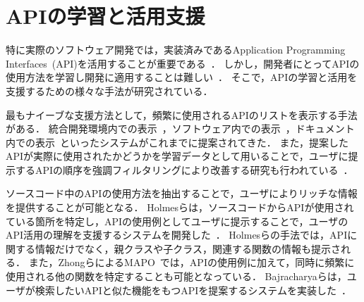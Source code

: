 

\section{APIの学習と活用支援}

特に実際のソフトウェア開発では，実装済みであるApplication Programming Interfaces~(API)を活用することが重要である~\cite{Patterns_for_API_migration}．
しかし，開発者にとってAPIの使用方法を学習し開発に適用することは難しい~\cite{robillard2011field}．
そこで，APIの学習と活用を支援するための様々な手法が研究されている．

最もナイーブな支援方法として，頻繁に使用されるAPIのリストを表示する手法がある．
統合開発環境内での表示~\cite{Holmes_2008_MSR_Eclipse_APIs}，ソフトウェア内での表示~\cite{UIST_2009_CommunityCommands}，ドキュメント内での表示~\cite{VLHCC_2009_API_doc_API_usage}といったシステムがこれまでに提案されてきた．
また，提案したAPIが実際に使用されたかどうかを学習データとして用いることで，ユーザに提示するAPIの順序を強調フィルタリングにより改善する研究も行われている~\cite{colab_filtering_api_recommend}．

ソースコード中のAPIの使用方法を抽出することで，ユーザによりリッチな情報を提供することが可能となる．
Holmesらは，ソースコードからAPIが使用されている箇所を特定し，APIの使用例としてユーザに提示することで，ユーザのAPI活用の理解を支援するシステムを開発した~\cite{Holmes_2006_recommend_api_example}．
Holmesらの手法では，APIに関する情報だけでなく，親クラスや子クラス，関連する関数の情報も提示される．
また，ZhongらによるMAPO~\cite{extended_MAPO}では，APIの使用例に加えて，同時に頻繁に使用される他の関数を特定することも可能となっている．
Bajracharyaらは，ユーザが検索したいAPIと似た機能をもつAPIを提案するシステムを実装した~\cite{Bajracharya:2010:LUS}．

